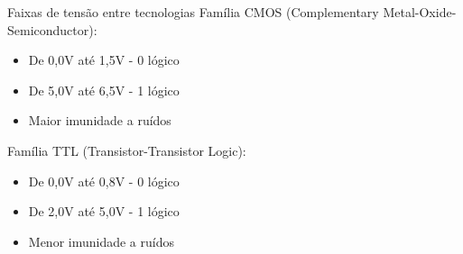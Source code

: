 

\begin{frame}{Faixas de tensão entre tecnologias}
    Família CMOS (Complementary Metal-Oxide-Semiconductor):
    \begin{itemize}
        \item De 0,0V até 1,5V - 0 lógico
        \item De 5,0V até 6,5V - 1 lógico
        \item Maior imunidade a ruídos
    \end{itemize}
    Família TTL (Transistor-Transistor Logic):
    \begin{itemize}
        \item De 0,0V até 0,8V - 0 lógico
        \item De 2,0V até 5,0V - 1 lógico
        \item Menor imunidade a ruídos
    \end{itemize}
\end{frame}
